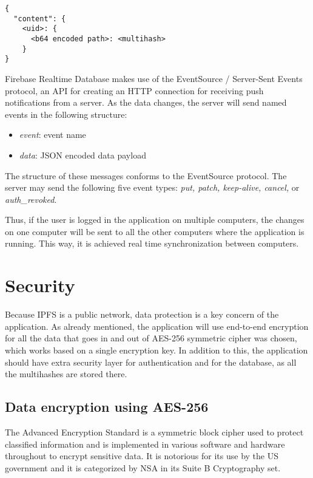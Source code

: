 \documentclass[12pt]{report}
\begin{document}
\begin{lstlisting}
{
  "content": {
    <uid>: {
      <b64 encoded path>: <multihash>
    }
}
\end{lstlisting}

Firebase Realtime Database makes use of the EventSource / Server-Sent Events protocol, an API for creating an HTTP connection for receiving push notifications from a server. As the data changes, the server will send named events in the following structure:
\begin{itemize}
\item \textit{event}: event name
\item \textit{data}: JSON encoded data payload
\end{itemize}

The structure of these messages conforms to the EventSource protocol. The server may send the following five event types: \textit{put, patch, keep-alive, cancel,} or \textit{auth\_revoked}.

Thus, if the user is logged in the application on multiple computers, the changes on one computer will be sent to all the other computers where the application is running. This way, it is achieved real time synchronization between computers. 

\section{Security}

Because IPFS is a public network, data protection is a key concern of the application. As already mentioned, the application will use end-to-end encryption for all the data that goes in and out of AES-256 symmetric cipher was chosen, which works based on a single encryption key. In addition to this, the application should have extra security layer for authentication and for the database, as all the multihashes are stored there. 

\subsection{Data encryption using AES-256}
\label{sec:aes}

The Advanced Encryption Standard \cite{aes} is a symmetric block cipher used to protect classified information and is implemented in various software and hardware throughout to encrypt sensitive data. It is notorious for its use by the US government and it is categorized by NSA in its Suite B Cryptography set. 
\end{document}
